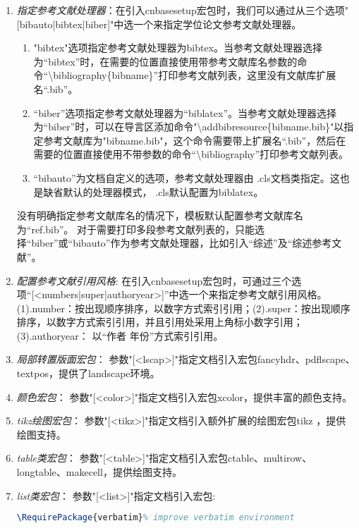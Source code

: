 \begin{enumerate}
    \item \emph{指定参考文献处理器}：在引入cnbasesetup宏包时，我们可以通过从三个选项"[bibauto|bibtex|biber]"中选一个来指定学位论文参考文献处理器。
        \begin{enumerate}
            \footnotesize
            \item "bibtex"选项指定参考文献处理器为bibtex。当参考文献处理器选择为“bibtex”时，在需要的位置直接使用带参考文献库名参数的命令“\backslash \projectname bibliography\{bibname\}”打印参考文献列表，这里没有文献库扩展名“.bib”。
            \item “biber”选项指定参考文献处理器为“biblatex”。当参考文献处理器选择为“biber”时，可以在导言区添加命令"\backslash addbibresource\{bibname.bib\}"以指定参考文献库为"bibname.bib"，这个命令需要带上扩展名“.bib”，然后在需要的位置直接使用不带参数的命令“\backslash \projectname bibliography”打印参考文献列表。
            \item “bibauto”为文档自定义的选项，参考文献处理器由 \projectname.cls文档类指定。这也是缺省默认的处理器模式， \projectname.cls默认配置为biblatex。
        \end{enumerate}
    没有明确指定参考文献库名的情况下，模板默认配置参考文献库名为“ref.bib”。
    对于需要打印多段参考文献列表的，只能选择“biber”或“bibauto”作为参考文献处理器，比如引入“综述”及“综述参考文献”。
    \item \emph{配置参考文献引用风格}: 在引入cnbasesetup宏包时，可通过三个选项“[<numbers|super|authoryear>]”中选一个来指定参考文献引用风格。(1).number：按出现顺序排序，以数字方式索引引用；(2).super：按出现顺序排序，以数字方式索引引用，并且引用处采用上角标小数字引用；(3).authoryear： 以“作者 年份”方式索引引用。
    \item \emph{局部转置版面宏包}： 参数"[<lscap>]"指定文档引入宏包fancyhdr、pdflscape、textpos，提供了landscape环境。
    \item \emph{颜色宏包}： 参数"[<color>]"指定文档引入宏包xcolor，提供丰富的颜色支持。
    \item \emph{tikz绘图宏包}： 参数"[<tikz>]"指定文档引入额外扩展的绘图宏包tikz ，提供绘图支持。
    \item \emph{table类宏包}： 参数"[<table>]"指定文档引入宏包ctable、multirow、longtable、makecell，提供绘图支持。
    \item \emph{list类宏包}： 参数"[<list>]"指定文档引入宏包:
        \begin{lstlisting}[language=tex]
            \RequirePackage{verbatim}% improve verbatim environment

\end{lstlisting}
\end{enumerate}
